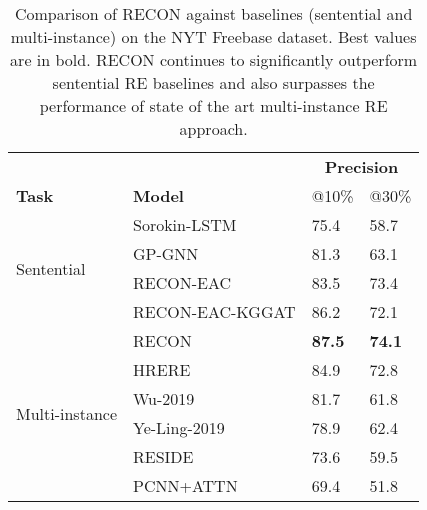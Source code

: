 \documentclass[sigconf]{acmart}
\begin{document}
\begin{table}[ht!]
\small
    \centering
    \begin{tabular}{p{1.3cm}|p{3cm}|p{0.75cm}|p{0.75cm}}
     \toprule
     & &\multicolumn{2}{c}{\textbf{Precision}}   \\
     \textbf{Task} & \textbf{Model} & @10\% & @30\% \\
\midrule
     \multirow{4}{*}{Sentential} & Sorokin-LSTM \cite{DBLP:conf/emnlp/SorokinG17}  & 75.4 & 58.7\\
     & GP-GNN \cite{DBLP:conf/acl/ZhuLLFCS19}  & 81.3 & 63.1\\
\cline{2-4}
     & RECON-EAC  &  83.5& 73.4 \\
& RECON-EAC-KGGAT  &  86.2 & 72.1 \\
& RECON & \textbf{87.5} &  \textbf{74.1} \\
     \cline{1-4}
     \multirow{4}{3pt}{Multi-instance} & HRERE~\cite{DBLP:conf/naacl/XuB19} & 84.9 & 72.8 \\
& Wu-2019 \cite{DBLP:conf/aaai/WuFZ19}  & 81.7 & 61.8\\
& Ye-Ling-2019 \cite{DBLP:conf/naacl/YeL19}& 78.9 & 62.4 \\
& RESIDE \cite{DBLP:conf/emnlp/VashishthJPBT18} & 73.6 &  59.5 \\
     & PCNN+ATTN \cite{lin2016neural} & 69.4 &  51.8 \\
\bottomrule
     
    \end{tabular}
\caption{Comparison of RECON against baselines (sentential and multi-instance) on the NYT Freebase dataset. Best values are in bold. RECON continues to significantly outperform sentential RE baselines and also surpasses the performance of state of the art multi-instance RE approach.}
\label{tab:results2}
    \vspace{-2mm}
\end{table}
\end{document}
